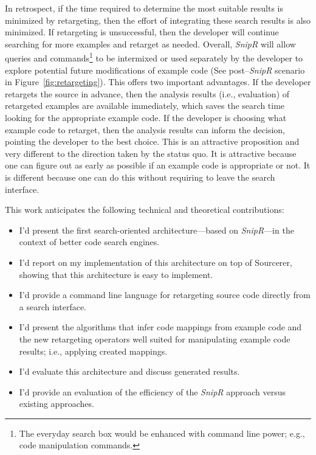 In retrospect, if the time required to determine the most suitable results is minimized by retargeting, then the effort of integrating these search results is also minimized. If retargeting is unsuccessful, then the developer will continue searching for more examples and retarget as needed. Overall, \emph{SnipR} will allow queries and commands\footnote{The everyday search box would be enhanced with command line power; e.g., code manipulation commands.} to be intermixed or used separately by the developer to explore potential future modifications of example code (See post--\emph{SnipR} scenario in Figure~\ref{fig:retargeting}). This offers two important advantages. If the developer retargets the source in advance, then the analysis results (i.e., evaluation) of retargeted examples are available immediately, which saves the search time looking for the appropriate example code. If the developer is choosing what example code to retarget, then the analysis results can inform the decision, pointing the developer to the best choice. This is an attractive proposition and very different to the direction taken by the status quo. It is attractive because one can figure out as early as possible if an example code is appropriate or not. It is different because one can do this without requiring to leave the search interface.

This work anticipates the following technical and theoretical contributions:

\begin{itemize}
\item I'd present the first search-oriented architecture---based on \emph{SnipR}---in the context of 
    better code search engines. 
\item I'd report on my implementation of this architecture on top of Sourcerer\cite{Bajracharya:2006vn}, showing that this architecture is easy to implement.
\item I'd provide a command line language for retargeting source code directly from a search interface. 
\item I'd present the algorithms that infer code mappings from example code and the new 
    retargeting operators well suited for manipulating example code results; i.e., applying created mappings.
\item I'd evaluate this architecture and discuss generated results.
\item I'd provide an evaluation of the efficiency of the \emph{SnipR} approach versus existing approaches. 
\end{itemize}


